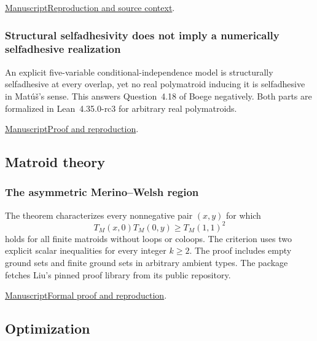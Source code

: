 \documentclass[11pt,a4paper]{article}
\begin{document}
\href{https://github.com/dvgyl/math-and-theory/blob/main/papers/mathematics/sidon-renyi/manuscript.pdf}{Manuscript}\quad\href{https://github.com/dvgyl/math-and-theory/blob/main/papers/mathematics/sidon-renyi/README.md}{Reproduction and source context}.

\subsubsection{Structural selfadhesivity does not imply a numerically selfadhesive realization}

An explicit five-variable conditional-independence model is structurally selfadhesive at every overlap, yet no real polymatroid inducing it is selfadhesive in Mat\'u\v{s}'s sense. This answers Question~4.18 of Boege negatively. Both parts are formalized in Lean~4.35.0-rc3 for arbitrary real polymatroids.

\noindent\href{https://github.com/dvgyl/math-and-theory/blob/main/papers/mathematics/structural-selfadhesivity/manuscript.pdf}{Manuscript}\quad\href{https://github.com/dvgyl/math-and-theory/blob/main/papers/mathematics/structural-selfadhesivity/README.md}{Proof and reproduction}.

\subsection{Matroid theory}

\subsubsection{The asymmetric Merino--Welsh region}

The theorem characterizes every nonnegative pair $(x,y)$ for which
\[
 T_M(x,0)T_M(0,y)\geq T_M(1,1)^2
\]
holds for all finite matroids without loops or coloops. The criterion uses two explicit scalar inequalities for every integer $k\geq2$. The proof includes empty ground sets and finite ground sets in arbitrary ambient types. The package fetches Liu's pinned proof library from its public repository.

\noindent\href{https://github.com/dvgyl/math-and-theory/blob/main/papers/mathematics/asymmetric-tutte/manuscript.pdf}{Manuscript}\quad\href{https://github.com/dvgyl/math-and-theory/blob/main/papers/mathematics/asymmetric-tutte/README.md}{Formal proof and reproduction}.

\subsection{Optimization}
\end{document}
